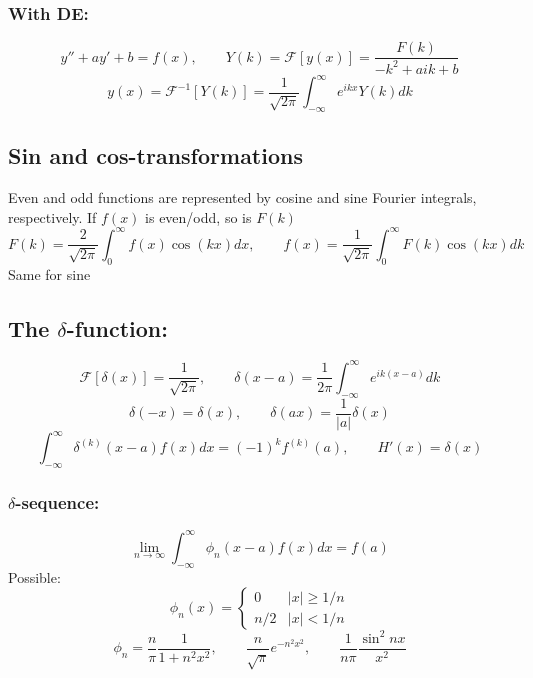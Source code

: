 \documentclass[a4paper,norsk, 10pt]{article}
\begin{document}
\subsubsection{With DE:}
\begin{equation}
y'' + ay' + b = f(x), \qquad Y(k) = \mathcal{F}[y(x)] = \frac{F(k)}{-k^2 + aik + b}
\end{equation}
\begin{equation}
y(x) = \mathcal{F}^{-1}[Y(k)] = \frac{1}{\sqrt{2\pi}}\int_{-\infty}^{\infty}e^{ikx}Y(k) dk
\end{equation}
\subsection{Sin and cos-transformations}
Even and odd functions are represented by cosine and sine Fourier integrals, respectively. If $f(x)$ is even/odd, so is $F(k)$
\begin{equation}
F(k) = \frac{2}{\sqrt{2\pi}}\int^{\infty}_0 f(x) \cos( kx) dx, \qquad f(x) = \frac{1}{\sqrt{2\pi}}\int^{\infty}_0 F(k) \cos(kx) dk
\end{equation}
Same for sine
\subsection{The $\delta$-function:}
\begin{equation}
\mathcal{F}[\delta(x)] = \frac{1}{\sqrt{2\pi}},\qquad \delta(x-a) = \frac{1}{2\pi}\int_{-\infty}^{\infty}e^{ik(x-a)}dk
\end{equation}
\begin{equation}
\delta(-x) = \delta(x),\qquad \delta(ax) = \frac{1}{|a|}\delta(x)
\end{equation}
\begin{equation}
\int_{-\infty}^{\infty}\delta^{(k)}(x-a)f(x)dx = (-1)^k f^{(k)}(a), \qquad H'(x) = \delta(x)
\end{equation}
\subsubsection{$\delta$-sequence:}
\begin{equation}
\lim_{n\rightarrow\infty}\int_{-\infty}^{\infty}\phi_n(x-a)f(x)dx = f(a)
\end{equation}
Possible:
\begin{equation}
\phi_n(x)=
\begin{cases}
0 & |x|\geq 1/n\\
n/2 & |x|< 1/n
\end{cases}
\end{equation}
\begin{equation}
\phi_n = \frac{n}{\pi}\frac{1}{1+n^2x^2},\qquad \frac{n}{\sqrt{\pi}}e^{-n^2x^2},\qquad \frac{1}{n\pi}\frac{\sin^2 nx}{x^2}
\end{equation}
\end{document}

